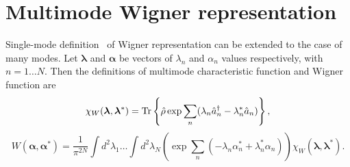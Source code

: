 \section{Multimode Wigner representation}


Single-mode definition~ of Wigner representation can be extended to the case of many modes.
Let $\bm{\lambda}$ and $\bm{\alpha}$ be vectors of $\lambda_n$ and $\alpha_n$ values respectively,
with $n = 1 \ldots N$.
Then the definitions of multimode characteristic function and Wigner function are
\[
	\chi_W (\bm{\lambda}, \bm{\lambda}^*)
	= \mathrm{Tr} \left\{  \hat{\rho} \exp \sum\limits_n
		(\lambda_n \hat{a}_n^\dagger - \lambda_n^* \hat{a}_n)  \right\},
\]
\begin{equation}
\label{eqn:formalism:mm-wigner:w-definition}
	W (\bm{\alpha}, \bm{\alpha}^*)
	= \frac{1}{\pi^{2N}} \int d^2 \lambda_1 \ldots \int d^2 \lambda_N
		\left(
			\exp \sum\limits_n (-\lambda_n \alpha_n^* + \lambda_n^* \alpha_n)
		\right)
		\chi_W (\bm{\lambda}, \bm{\lambda}^*).
\end{equation}

